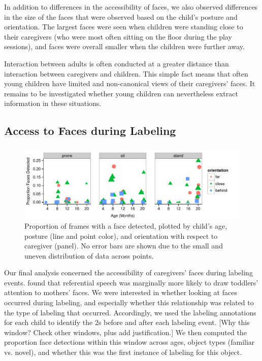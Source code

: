 \documentclass[10pt,letterpaper]{article}
\begin{document}

In addition to differences in the accessibility of faces, we also observed differences in the size of the faces that were observed based on the child's posture and orientation. The largest faces were seen when children were standing close to their caregivers (who were most often sitting on the floor during the play sessions), and faces were overall smaller when the children were further away. 


Interaction between adults is often conducted at a greater distance than interaction between caregivers and children. This simple fact means that often young children have limited and non-canonical views of their caregivers' faces. It remains to be investigated whether young children can nevertheless extract information in these situations. 


\subsection{Access to Faces during Labeling}


\begin{figure}
\centering
\includegraphics[width=6.5in]{figures/faces_by_posture.pdf}
\caption{\label{fig:faces_by_posture} Proportion of frames with a face detected, plotted by child's age, posture (line and point color), and orientation with respect to caregiver (panel). No error bars are shown due to the small and uneven distribution of data across points.} 
\end{figure}

Our final analysis concerned the accessibility of caregivers' faces during labeling events.  found that referential speech was marginally more likely to draw toddlers' attention to mothers' faces. We were interested in whether looking at faces occurred during labeling, and especially whether this relationship was related to the type of labeling that occurred. Accordingly, we used the labeling annotations for each child to identify the 2s before and after each labeling event. [Why this window? Check other windows, plus add justification.] We then computed the proportion face detections within this window across ages, object types (familiar vs. novel), and whether this was the first instance of labeling for this object. 
\end{document}
